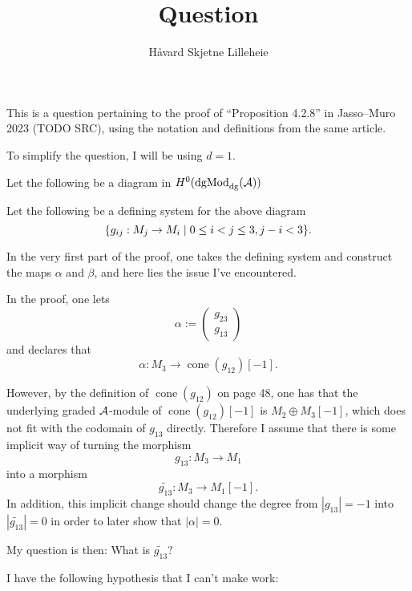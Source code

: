 \documentclass[a4paper, 12pt]{article}
\title{Question}
\author{Håvard Skjetne Lilleheie}
\DeclareMathOperator{\cone}{cone}
\begin{document}
This is a question pertaining to the proof of ``Proposition 4.2.8'' in Jasso--Muro 2023 (TODO SRC), using the notation and definitions from the same article.

To simplify the question, I will be using \( d = 1 \).

Let the following be a diagram in \( H^0(\operatorname{dgMod}_{\operatorname{dg}}({\mathcal{A}})) \)
\begin{center}
\end{center}

Let the following be a defining system for the above diagram
\[
    \{g_{ij}: M_j \to M_i \mid 0 \leq i < j \leq 3, j - i < 3\}.
\]

In the very first part of the proof, one takes the defining system and construct the maps \( \alpha \) and \( \beta \), and here lies the issue I've encountered.

In the proof, one lets
\[
    \alpha :=
    \begin{pmatrix}
        g_{23} \\
        g_{13}
    \end{pmatrix}
\]
and declares that
\[
    \alpha: M_3 \to \cone(g_{12})[-1].
\]

However, by the definition of \( \cone(g_{12}) \) on page 48, one has that the underlying graded \( {\mathcal{A}} \)-module of \( \cone(g_{12})[-1] \) is \( M_2 \oplus M_3[-1] \), which does not fit with the codomain of \( g_{13} \) directly. Therefore I assume that there is some implicit way of turning the morphism
\[
    g_{13}: M_3 \to M_1
\]
into a morphism
\[
    \widetilde{g_{13}}: M_3 \to M_1[-1].
\]
In addition, this implicit change should change the degree from \( |g_{13}| = -1 \) into \( |\widetilde{g_{13}}| = 0 \) in order to later show that \( |\alpha| = 0 \).

My question is then: What is \( \widetilde{g_{13}} \)?

I have the following hypothesis that I can't make work:
\end{document}
